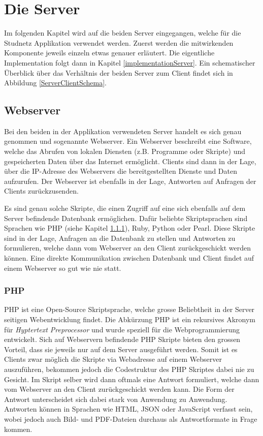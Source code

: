 \documentclass[../main.tex]{subfiles}
\begin{document}
	\chapter{Die Server}
	Im folgenden Kapitel wird auf die beiden Server eingegangen, welche für die Studnetz Applikation verwendet werden. Zuerst werden die mitwirkenden Komponente jeweils einzeln etwas genauer erläutert. Die eigentliche Implementation folgt dann in Kapitel \ref{implementationServer}. Ein schematischer Überblick über das Verhältnis der beiden Server zum Client findet sich in Abbildung \ref{ServerClientSchema}.
	
	\section{Webserver}
	Bei den beiden in der Applikation verwendeten Server handelt es sich genau genommen und sogenannte Webserver. Ein Webserver beschreibt eine Software, welche das Abrufen von lokalen Diensten (z.B. Programme oder Skripte) und gespeicherten Daten über das Internet ermöglicht. Clients sind dann in der Lage, über die IP-Adresse des Webservers die bereitgestellten Dienste und Daten aufzurufen. Der Webserver ist ebenfalls in der Lage, Antworten auf Anfragen der Clients zurückzusenden.
	
	Es sind genau solche Skripte, die einen Zugriff auf eine sich ebenfalls auf dem Server befindende Datenbank ermöglichen. Dafür beliebte Skriptsprachen sind Sprachen wie PHP (siehe Kapitel \ref{php}), Ruby, Python oder Pearl. Diese Skripte sind in der Lage, Anfragen an die Datenbank zu stellen und Antworten zu formulieren, welche dann vom Webserver an den Client zurückgeschickt werden können. Eine direkte Kommunikation zwischen Datenbank und Client findet auf einem Webserver so gut wie nie statt.
	
	\subsection{PHP}\label{php}
	PHP ist eine Open-Source Skriptsprache, welche grosse Beliebtheit in der Server seitigen Webentwicklung findet. Die Abkürzung PHP ist ein rekursives Akronym für \emph{Hyptertext Preprocessor} und wurde speziell für die Webprogrammierung entwickelt. Sich auf Webservern befindende PHP Skripte bieten den grossen Vorteil, dass sie jeweils nur auf dem Server ausgeführt werden. Somit ist es Clients zwar möglich die Skripte via Webadresse auf einem Webserver auszuführen, bekommen jedoch die Codestruktur des PHP Skriptes dabei nie zu Gesicht. \cite{PHP} Im Skript selber wird dann oftmals eine Antwort formuliert, welche dann vom Webserver an den Client zurückgeschickt werden kann. Die Form der Antwort unterscheidet sich dabei stark von Anwendung zu Anwendung. Antworten können in Sprachen wie HTML, JSON oder JavaScript verfasst sein, wobei jedoch auch Bild- und PDF-Dateien durchaus als Antwortformate in Frage kommen.\cite{PHP:function}
	
\end{document}
